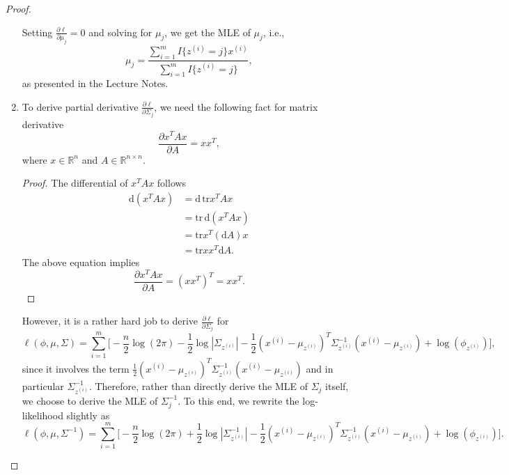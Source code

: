 \documentclass{article}
\begin{document}
\begin{proof}
\begin{enumerate}
                Setting $\frac{\partial{\ell}}{\partial{\mu_j}}=0$ and solving for $\mu_j$, we get the MLE of $\mu_j$, i.e.,
                \[
                \mu_j=\frac{\sum_{i=1}^m I\{z^{(i)}=j\}x^{(i)}}{\sum_{i=1}^m I\{z^{(i)}=j\}},
                \]
                as presented in the Lecture Notes.

                \item To derive partial derivative $\frac{\partial{\ell}}{\partial{\Sigma_j}}$, we need the following fact for matrix derivative
                \[
                \frac{\partial{x^TAx}}{\partial{A}}=xx^T,
                \]
                where $x\in\mathbb{R}^n$ and $A\in{\mathbb{R}^{n\times{n}}}$.
                \begin{proof}
                The differential of $x^TAx$ follows
                \[
                \begin{split}
                \text{d}(x^TAx)
                &=\text{d}\,\text{tr}x^TAx\\
                &=\text{tr}\,\text{d}(x^TAx)\\
                &=\text{tr}x^T(\text{d}A)x\\
                &=\text{tr}xx^T\text{d}A.
                \end{split}
                \]
                The above equation implies
                \[
                \frac{\partial{x^TAx}}{\partial{A}}=(xx^T)^T=xx^T.
                \]
                \end{proof}
                However, it is a rather hard job to derive $\frac{\partial{\ell}}{\partial{\Sigma_j}}$ for
                \[
                \ell(\phi,\mu,\Sigma)=\sum_{i=1}^m\Bigg[-\frac{n}{2}\log(2\pi)-\frac{1}{2}\log|\Sigma_{z^{(i)}}|%
                -\frac{1}{2}(x^{(i)}-\mu_{z^{(i)}})^T\Sigma_{z^{(i)}}^{-1}(x^{(i)}-\mu_{z^{(i)}})%
                +\log(\phi_{z^{(i)}})\Bigg],
                \]
                since it involves the term $\frac{1}{2}(x^{(i)}-\mu_{z^{(i)}})^T\Sigma_{z^{(i)}}^{-1}(x^{(i)}-\mu_{z^{(i)}})$ and in particular $\Sigma_{z^{(i)}}^{-1}$. Therefore, rather than directly derive the MLE of $\Sigma_j$ itself, we choose to derive the MLE of $\Sigma_j^{-1}$. To this end, we rewrite the log-likelihood slightly as
                \[
                \ell(\phi,\mu,\Sigma^{-1})=\sum_{i=1}^m\Bigg[-\frac{n}{2}\log(2\pi)+\frac{1}{2}\log|\Sigma_{z^{(i)}}^{-1}|%
                -\frac{1}{2}(x^{(i)}-\mu_{z^{(i)}})^T\Sigma_{z^{(i)}}^{-1}(x^{(i)}-\mu_{z^{(i)}})%
                +\log(\phi_{z^{(i)}})\Bigg].
                \]

\end{enumerate}
\end{proof}
\end{document}
